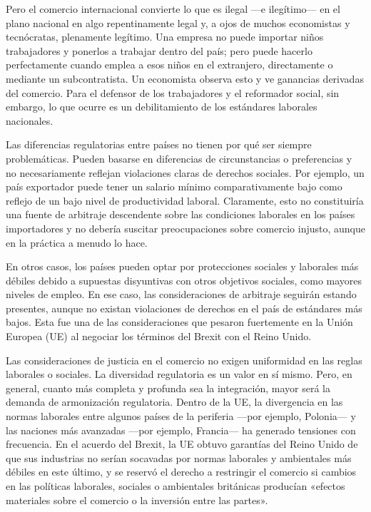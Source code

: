 \documentclass[10pt,a4paper]{article}
\begin{document}
Pero el comercio internacional convierte lo que es ilegal —e ilegítimo— en el plano nacional en algo repentinamente legal y, a ojos de muchos economistas y tecnócratas, plenamente legítimo. Una empresa no puede importar niños trabajadores y ponerlos a trabajar dentro del país; pero puede hacerlo perfectamente cuando emplea a esos niños en el extranjero, directamente o mediante un subcontratista. Un economista observa esto y ve ganancias derivadas del comercio. Para el defensor de los trabajadores y el reformador social, sin embargo, lo que ocurre es un debilitamiento de los estándares laborales nacionales.

Las diferencias regulatorias entre países no tienen por qué ser siempre problemáticas. Pueden basarse en diferencias de circunstancias o preferencias y no necesariamente reflejan violaciones claras de derechos sociales. Por ejemplo, un país exportador puede tener un salario mínimo comparativamente bajo como reflejo de un bajo nivel de productividad laboral. Claramente, esto no constituiría una fuente de arbitraje descendente sobre las condiciones laborales en los países importadores y no debería suscitar preocupaciones sobre comercio injusto, aunque en la práctica a menudo lo hace.

En otros casos, los países pueden optar por protecciones sociales y laborales más débiles debido a supuestas disyuntivas con otros objetivos sociales, como mayores niveles de empleo. En ese caso, las consideraciones de arbitraje seguirán estando presentes, aunque no existan violaciones de derechos en el país de estándares más bajos. Esta fue una de las consideraciones que pesaron fuertemente en la Unión Europea (UE) al negociar los términos del Brexit con el Reino Unido.

Las consideraciones de justicia en el comercio no exigen uniformidad en las reglas laborales o sociales. La diversidad regulatoria es un valor en sí mismo. Pero, en general, cuanto más completa y profunda sea la integración, mayor será la demanda de armonización regulatoria. Dentro de la UE, la divergencia en las normas laborales entre algunos países de la periferia —por ejemplo, Polonia— y las naciones más avanzadas —por ejemplo, Francia— ha generado tensiones con frecuencia. En el acuerdo del Brexit, la UE obtuvo garantías del Reino Unido de que sus industrias no serían socavadas por normas laborales y ambientales más débiles en este último, y se reservó el derecho a restringir el comercio si cambios en las políticas laborales, sociales o ambientales británicas producían «efectos materiales sobre el comercio o la inversión entre las partes».
\end{document}
